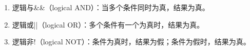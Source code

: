 \begin{enumerate}
	\item 逻辑与\&\&（logical AND）：当多个条件同时为真，结果为真。
	      \begin{table}[H]
		      \centering
		      \caption{逻辑与}
	      \end{table}

	\item 逻辑或||（logical OR）：多个条件有一个为真时，结果为真。
	      \begin{table}[H]
		      \centering
		      \caption{逻辑或}
	      \end{table}

	\item 逻辑非!（logical NOT）：条件为真时，结果为假；条件为假时，结果为真。
	      \begin{table}[H]
		      \centering
		      \caption{逻辑非}
	      \end{table}
\end{enumerate}

